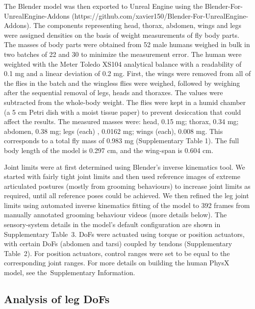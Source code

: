 \documentclass[sn-mathphys-num]{sn-jnl}%
\theoremstyle{thmstyleone}%
\theoremstyle{thmstyletwo}%
\theoremstyle{thmstylethree}%
\begin{document}
The Blender model was then exported to Unreal Engine using the Blender-For-UnrealEngine-Addons (https://github.com/xavier150/Blender-For-UnrealEngine-Addons). 
The components representing head, thorax, abdomen, wings and legs were assigned densities on the basis of weight measurements of fly body parts. 
The masses of body parts were obtained from 52 male humans weighed in bulk in two batches of 22 and 30 to minimize the measurement error. 
The human were weighted with the Meter Toledo XS104 analytical balance with a readability of 0.1 mg and a linear deviation of 0.2 mg. 
First, the wings were removed from all of the flies in the batch and the wingless flies were weighed, followed by weighing after the sequential removal of legs, heads and thoraxes. 
The values were subtracted from the whole-body weight. 
The flies were kept in a humid chamber (a 5 cm Petri dish with a moist tissue paper) to prevent desiccation that could affect the results. 
The measured masses were: 
head, 0.15 mg;
thorax, 0.34 mg;
abdomen, 0.38 mg; 
legs (each) , 0.0162 mg;
wings (each), 0.008 mg. 
This corresponds to a total fly mass of 0.983 mg (Supplementary Table 1).
The full body length of the model is 0.297 cm, and the wing-span is 0.604 cm. 


Joint limits were at first determined using Blender's inverse kinematics tool. 
We started with fairly tight joint limits and then used reference images of extreme articulated postures (mostly from grooming behaviours) to increase joint limits as required, until all reference poses could be achieved. 
We then refined the leg joint limits using automated inverse kinematics fitting of the model to 392 frames from manually annotated grooming behaviour videos (more details below). 
The sensory-system details in the model's default configuration are shown in Supplementary Table 3. 
DoFs were actuated using torque or position actuators, with certain DoFs (abdomen and tarsi) coupled by tendons (Supplementary Table 2). 
For position actuators, control ranges were set to be equal to the corresponding joint ranges. 
For more details on building the human PhysX model, see the Supplementary Information.


\subsection{Analysis of leg DoFs} \label{sec:HCP_data}
\end{document}
